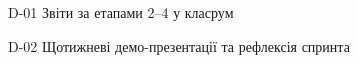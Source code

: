 \item D-01 Звіти за етапами 2–4 у класрум
\item D-02 Щотижневі демо-презентації та рефлексія спринта